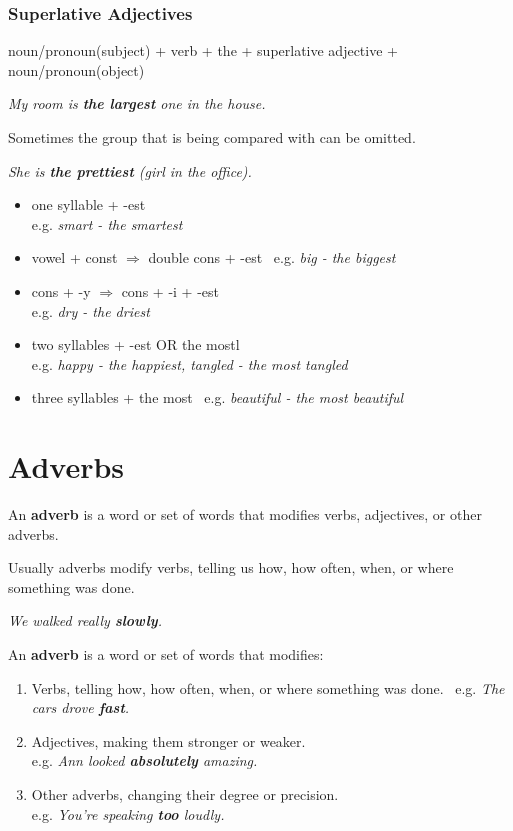 \documentclass[hidelinks,10pt,a4paper]{article}
\begin{document}
\subsubsection{Superlative Adjectives}
noun/pronoun(subject) + verb + the + superlative adjective + noun/pronoun(object)
\begin{center}
	\textit{My room is \textbf{the largest} one in the house.}
\end{center}

Sometimes the group that is being compared with can be omitted.

\begin{center}
	\textit{She is \textbf{the prettiest} (girl in the office).}
\end{center}

\begin{itemize}
	\item one syllable + -est \\
		e.g. \textit{smart - the smartest}
	\item vowel + const $\Rightarrow$ double cons + -est \
		e.g. \textit{big - the biggest}
	\item cons + -y $\Rightarrow$ cons + -i + -est \\
		e.g. \textit{dry - the driest}
	\item two syllables + -est OR the mostl \\
		e.g. \textit{happy - the happiest, tangled - the most tangled}
	\item three syllables + the most \
		e.g. \textit{beautiful - the most beautiful}
\end{itemize}


\section{Adverbs}
An \textbf{adverb} is a word or set of words that modifies verbs, adjectives, or other adverbs.

Usually adverbs modify verbs, telling us how, how often, when, or where something was done.

\begin{center}
	\textit{We walked really \textbf{slowly}.}
\end{center}

An \textbf{adverb} is a word or set of words that modifies:

\begin{enumerate}[label=(\alph*)]
	\item Verbs, telling how, how often, when, or where something was done. \
		e.g. \textit{The cars drove \textbf{fast}.}
	\item Adjectives, making them stronger or weaker. \\
		e.g. \textit{Ann looked \textbf{absolutely} amazing.}
	\item Other adverbs, changing their degree or precision. \\
		e.g. \textit{You're speaking \textbf{too} loudly.}
\end{enumerate}
\end{document}

